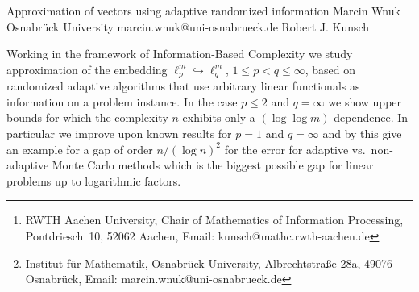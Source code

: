 \documentclass[12pt]{article}
\theoremstyle{plain}
\theoremstyle{definition}
\renewcommand{\vec}{\boldsymbol}
\newenvironment{MW}{\begingroup\color{red}}{\endgroup}
\begin{document}



\author{Robert J. Kunsch\thanks{RWTH Aachen University,
Chair of Mathematics of Information Processing,
Pontdriesch~10,
52062 Aachen, Email: kunsch@mathc.rwth-aachen.de
}, 
\thanks{Institut für Mathematik, 
Osnabrück University, Albrechtstraße 28a, 49076 Osnabrück, 
Email: marcin.wnuk@uni-osnabrueck.de}} %

\begin{talk}
{Approximation of vectors using adaptive randomized information}
{Marcin Wnuk}
{Osnabr\"uck University}
{marcin.wnuk@uni-osnabrueck.de}
{Robert J. Kunsch}
{}


Working in the framework of Information-Based Complexity we study approximation of the embedding $\ell_p^m \hookrightarrow \ell_q^m$, $1 \leq p < q \leq \infty$,
based on randomized adaptive algorithms that use arbitrary linear 
functionals as information on a problem instance.
In the case $p \leq 2$ and $q = \infty$
we show upper bounds for which the complexity $n$ 
exhibits only a $(\log\log m)$-dependence. 
In particular we improve upon known results for $p=1$ and $q=\infty$
and by this give an example for a gap of order $n / (\log n)^2$
for the error for adaptive vs.\ non-adaptive Monte Carlo methods
which is the biggest possible gap for linear problems up to logarithmic factors.

\end{talk}
\end{document}
